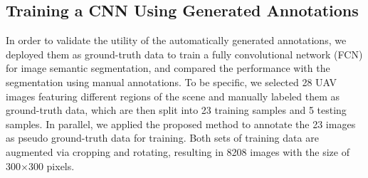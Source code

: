 

\subsection{Training a CNN Using Generated Annotations}
\label{sec:seg}

In order to validate the utility of the automatically generated annotations, we deployed them as ground-truth data to train a fully convolutional network (FCN) \cite{fcn} for image semantic segmentation, and compared the performance with the segmentation using manual annotations. To be specific, we selected 28 UAV images featuring different regions of the scene and manually labeled them as ground-truth data, which are then split into 23 training samples and 5 testing samples. In parallel, we applied the proposed method to annotate the 23 images as pseudo ground-truth data for training. Both sets of training data are augmented via cropping and rotating, resulting in 8208 images with the size of 300$\times$300 pixels.

